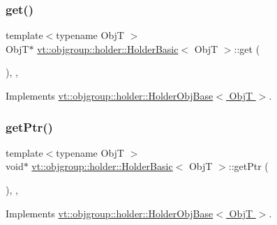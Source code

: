 \subsubsection{\texorpdfstring{get()}{get()}}
{\footnotesize\ttfamily template$<$typename ObjT $>$ \\
ObjT$\ast$ \hyperlink{structvt_1_1objgroup_1_1holder_1_1_holder_basic}{vt\+::objgroup\+::holder\+::\+Holder\+Basic}$<$ ObjT $>$\+::get (\begin{DoxyParamCaption}{ }\end{DoxyParamCaption})\hspace{0.3cm}{\ttfamily [inline]}, {\ttfamily [override]}, {\ttfamily [virtual]}}



Implements \hyperlink{structvt_1_1objgroup_1_1holder_1_1_holder_obj_base_a4b350b0126259d31a62fd426a08f6698}{vt\+::objgroup\+::holder\+::\+Holder\+Obj\+Base$<$ Obj\+T $>$}.

\mbox{\label{structvt_1_1objgroup_1_1holder_1_1_holder_basic_a2a8962345709045e6d2c465b17362885}} 
\subsubsection{\texorpdfstring{get\+Ptr()}{getPtr()}}
{\footnotesize\ttfamily template$<$typename ObjT $>$ \\
void$\ast$ \hyperlink{structvt_1_1objgroup_1_1holder_1_1_holder_basic}{vt\+::objgroup\+::holder\+::\+Holder\+Basic}$<$ ObjT $>$\+::get\+Ptr (\begin{DoxyParamCaption}{ }\end{DoxyParamCaption})\hspace{0.3cm}{\ttfamily [inline]}, {\ttfamily [override]}, {\ttfamily [virtual]}}



Implements \hyperlink{structvt_1_1objgroup_1_1holder_1_1_holder_obj_base_aa08fdb3d076043c004e3674a136f84c3}{vt\+::objgroup\+::holder\+::\+Holder\+Obj\+Base$<$ Obj\+T $>$}.

\mbox{\label{structvt_1_1objgroup_1_1holder_1_1_holder_basic_ae0e03732280c6c1cf44f9ff8f24426c2}} 
